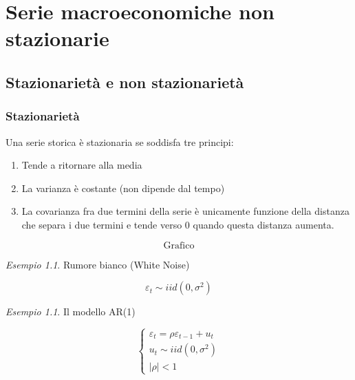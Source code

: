 \documentclass[a4paper]{report}
\newcounter{ese}
\theoremstyle{remark}
\newtheorem{esempio}[ese]{Esempio}
\newcounter{theor}
\begin{document}
\chapter{Serie macroeconomiche non stazionarie}

\section{Stazionariet\`{a} e non stazionariet\`{a}}

\subsection{Stazionariet\`{a}}

Una serie storica \`{e} stazionaria se soddisfa tre principi:

\begin{enumerate}
\item Tende a ritornare alla media

\item La varianza \`{e} costante (non dipende dal tempo)

\item La covarianza fra due termini della serie \`{e} unicamente funzione
della distanza che separa i due termini e tende verso 0 quando questa
distanza aumenta.
\end{enumerate}

\begin{equation*}
\text{Grafico}
\end{equation*}%
\vspace{5cm}

\begin{esempio}
Rumore bianco (White Noise)
\end{esempio}

\begin{equation*}
\varepsilon _{t}\sim iid(0,\sigma ^{2})
\end{equation*}

\begin{esempio}
\label{esempioAR1}Il modello AR(1)
\end{esempio}

\begin{equation*}
\left\{ 
\begin{array}{c}
\varepsilon _{t}=\rho \varepsilon _{t-1}+u_{t} \\ 
u_{t}\sim iid(0,\sigma ^{2}) \\ 
|\rho| <1%
\end{array}%
\right.
\end{equation*}
\end{document}
